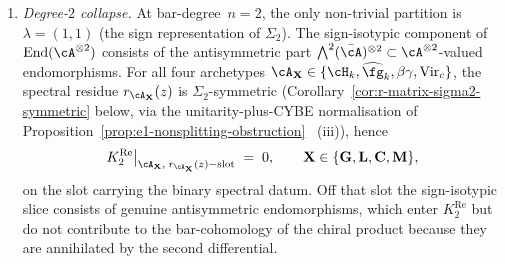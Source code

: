 \begin{theorem}
\begin{enumerate}[label=\textup{(\roman*)}]
\item \emph{Degree-$2$ collapse.} At bar-degree~$n=2$, the only
non-trivial partition is $\lambda=(1,1)$ (the sign representation of
$\Sigma_2$). The sign-isotypic component of
$\operatorname{End}(\cA^{\otimes 2})$ consists of the antisymmetric
part $\bigwedge^2(\bar\cA)^{\otimes 2}\subset\cA^{\otimes 2}$-valued
endomorphisms. For all four archetypes
$\cA_\mathbf{X}\in\{\cH_k,\widehat{\fg}_k,\beta\gamma,
\mathrm{Vir}_c\}$, the spectral residue $r_{\cA_\mathbf{X}}(z)$ is
$\Sigma_2$-symmetric (Corollary~\ref{cor:r-matrix-sigma2-symmetric}
below, via the unitarity-plus-CYBE normalisation of
Proposition~\textup{\ref{prop:e1-nonsplitting-obstruction}}~%
\textup{(iii)}), hence
\begin{equation}\label{eq:ker-av-deg2-vanish}
 K^{\mathrm{Re}}_2\big|_{\cA_\mathbf{X},\;r_{\cA_\mathbf{X}}(z)-\mathrm{slot}}
 \;=\; 0,
 \qquad \mathbf{X}\in\{\mathbf{G},\mathbf{L},\mathbf{C},\mathbf{M}\},
\end{equation}
on the slot carrying the binary spectral datum. Off that slot the
sign-isotypic slice consists of genuine antisymmetric endomorphisms,
which enter \(K^{\mathrm{Re}}_2\) but do not contribute to the
bar-cohomology of the chiral product because they are annihilated
by the second differential.


\end{enumerate}
\end{theorem}
